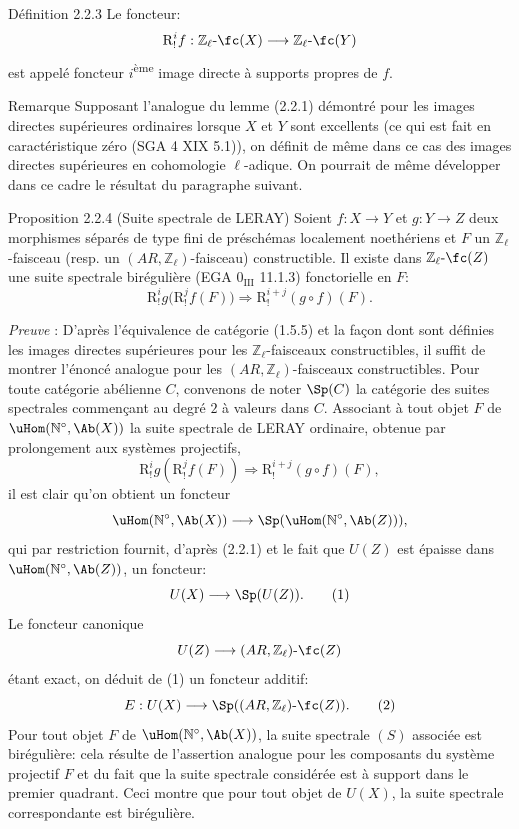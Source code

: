 \begin{statement}{Définition 2.2.3}
Le foncteur:
\[
\mathrm{R}^i_!f:\mathbb{Z}_\ell\text{-}\fc(X)\longrightarrow \mathbb{Z}_\ell\text{-}\fc(Y)
\]
est appelé foncteur \(i\)\textsuperscript{ème} image directe à supports propres de \(f\).
\end{statement}

\begin{statement}{Remarque}
Supposant l'analogue du lemme (2.2.1) démontré pour les images directes supérieures ordinaires lorsque \(X\) et \(Y\) sont excellents (ce qui est fait en caractéristique zéro (SGA 4 XIX 5.1)), on définit de même dans ce cas des images directes supérieures en cohomologie \(\ell\)-adique. On pourrait de même développer dans ce cadre le résultat du paragraphe suivant.
\end{statement}

\begin{statement}{Proposition 2.2.4 (Suite spectrale de LERAY)}
Soient \(f:X\to Y\) et \(g:Y\to Z\) deux morphismes séparés de type fini de préschémas localement noethériens et \(F\) un \(\mathbb{Z}_\ell\)-faisceau (resp. un \((AR,\mathbb{Z}_\ell)\)-faisceau) constructible. Il existe dans \(\mathbb{Z}_\ell\text{-}\fc(Z)\) une suite spectrale birégulière (EGA \(0_{\mathrm{III}}\) 11.1.3) fonctorielle en \(F\):
\[
\mathrm{R}^i_!g\bigl(\mathrm{R}^j_!f(F)\bigr)\Longrightarrow \mathrm{R}^{i+j}_!(g\circ f)(F).
\]
\end{statement}

\emph{Preuve} : D'après l'équivalence de catégorie (1.5.5) et la façon dont sont définies les images directes supérieures pour les \(\mathbb{Z}_\ell\)-faisceaux constructibles, il suffit de montrer l'énoncé analogue pour les \((AR,\mathbb{Z}_\ell)\)-faisceaux constructibles. Pour toute catégorie abélienne \(C\), convenons de noter \(\Sp(C)\) 
la
catégorie des suites spectrales commençant au degré \(2\) à valeurs dans \(C\). Associant à tout objet \(F\) de \(\uHom(\mathbb{N}^\circ,\Ab(X))\) la suite spectrale de LERAY ordinaire, obtenue par prolongement aux systèmes projectifs,
\[
\mathrm{R}^i_! g(\mathrm{R}^j_! f(F))\Longrightarrow \mathrm{R}^{i+j}_!(g\circ f)(F),
\tag{S}
\]
il est clair qu'on obtient un foncteur
\[
\uHom(\mathbb{N}^\circ,\Ab(X))\longrightarrow \Sp(\uHom(\mathbb{N}^\circ,\Ab(Z))),
\]
qui par restriction fournit, d'après (2.2.1) et le fait que \(U(Z)\) est épaisse dans \(\uHom(\mathbb{N}^\circ,\Ab(Z))\), un foncteur:
\[
U(X)\longrightarrow \Sp(U(Z)).
\tag{1}
\]
Le foncteur canonique
\[
U(Z)\longrightarrow (AR,\mathbb{Z}_\ell)\text{-}\fc(Z)
\]
étant exact, on déduit de (1) un foncteur additif:
\[
E:U(X)\longrightarrow \Sp((AR,\mathbb{Z}_\ell)\text{-}\fc(Z)).
\tag{2}
\]
Pour tout objet \(F\) de \(\uHom(\mathbb{N}^\circ,\Ab(X))\), la suite spectrale \((S)\) associée est birégulière: cela résulte de l'assertion analogue pour les composants du système projectif \(F\) et du fait que la suite spectrale considérée est à support dans le premier quadrant. Ceci montre que pour tout objet de \(U(X)\), la suite spectrale correspondante est birégulière.

